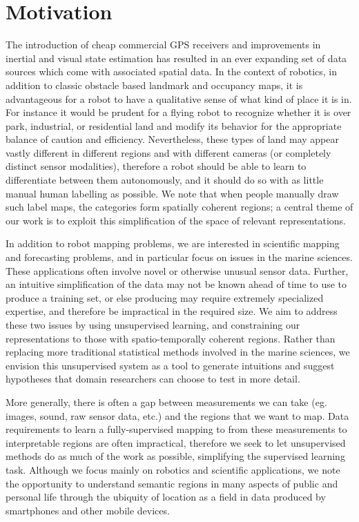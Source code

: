 \section{Motivation}
The introduction of cheap commercial GPS receivers and improvements in inertial and visual state estimation has resulted in an ever expanding set of data sources which come with associated spatial data. In the context of robotics, in addition to classic obstacle based landmark and occupancy maps, it is advantageous for a robot to have a qualitative sense of what kind of place it is in. For instance it would be prudent for a flying robot to recognize whether it is over park, industrial, or residential land and modify its behavior for the appropriate balance of caution and efficiency. Nevertheless, these types of land may appear vastly different in different regions and with different cameras (or completely distinct sensor modalities), therefore a robot should be able to learn to differentiate between them autonomously, and it should do so with as little manual human labelling as possible. We note that when people manually draw such label maps, the categories form spatially coherent regions; a central theme of our work is to exploit this simplification of the space of relevant representations.

In addition to robot mapping problems, we are interested in scientific mapping and forecasting problems, and in particular focus on issues in the marine sciences. These applications often involve novel or otherwise unusual sensor data. Further, an intuitive simplification of the data may not be known ahead of time to use to produce a training set, or else producing may require extremely specialized expertise, and therefore be impractical in the required size. We aim to address these two issues by using unsupervised learning, and constraining our representations to those with spatio-temporally coherent regions. Rather than replacing more traditional statistical methods involved in the marine sciences, we envision this unsupervised system as a tool to generate intuitions and suggest hypotheses that domain researchers can choose to test in more detail.

More generally, there is often a gap between measurements we can take (eg. images, sound, raw sensor data, etc.) and the regions that we want to map. Data requirements to learn a fully-supervised mapping to from these measurements to interpretable regions are often impractical, therefore we seek to let unsupervised methods do as much of the work as possible, simplifying the supervised learning task. Although we focus mainly on robotics and scientific applications, we note the opportunity to understand semantic regions in many aspects of public and personal life through the ubiquity of location as a field in data produced by smartphones and other mobile devices.

